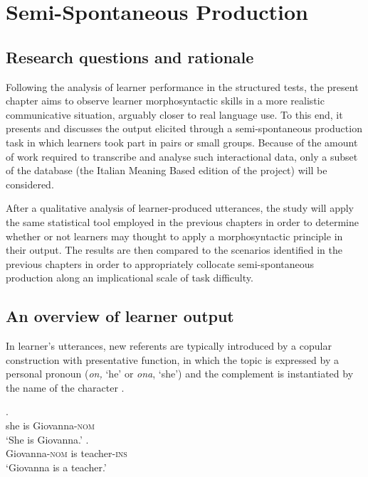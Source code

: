 \chapter{Semi-Spontaneous Production}

\section{Research questions and rationale}\label{sec:07:1}

Following the analysis of learner performance in the structured tests, the present chapter aims to observe learner morphosyntactic skills in a more realistic communicative situation, arguably closer to real language use. To this end, it presents and discusses the output elicited through a semi-spontaneous production task in which learners took part in pairs or small groups. Because of the amount of work required to transcribe and analyse such interactional data, only a subset of the database (the Italian Meaning Based edition of the project) will be considered.

After a qualitative analysis of learner-produced utterances, the study will apply the same statistical tool employed in the previous chapters in order to determine whether or not learners may thought to apply a morphosyntactic principle in their output. The results are then compared to the scenarios identified in the previous chapters in order to appropriately collocate semi-spontaneous production along an implicational scale of task difficulty.

\section{An overview of learner output}\label{sec:07:2}

In learner’s utterances, new referents are typically introduced by a copular construction with presentative function, in which the topic is expressed by a personal pronoun (\textit{on,} ‘he’ or \textit{ona}, ‘she’) and the complement is instantiated by the name of the character .

\ea%
    \label{ex:07:1}
    \ea\label{ex:07:1a}
    .\\
            \hspaceThis{[}she  is  Giovanna-\textsc{nom}\\
    \glt    ‘She is Giovanna.’
    \ex\label{ex:07:1b}
    .  \\
            \hspaceThis{[}Giovanna-\textsc{nom}  is  teacher-\textsc{ins}\\
    \glt    ‘Giovanna is a teacher.’
    \z
\z

